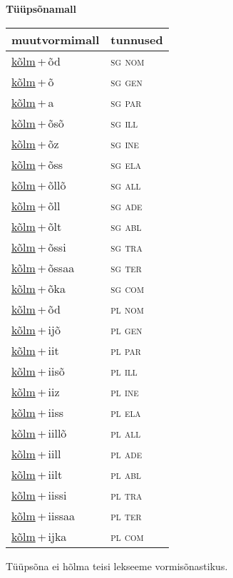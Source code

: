 
\vspace{1.8em}
\begin{minipage}{\textwidth}
\textbf{Tüüpsõnamall \,}\\

\begin{sideways}
\begin{tabular}{l l}
muutvormimall & tunnused \\
\hline
\underline{kõlm}\,+\,õd & \textsc{ sg nom } \\
\underline{kõlm}\,+\,õ & \textsc{ sg gen } \\
\underline{kõlm}\,+\,a & \textsc{ sg par } \\
\underline{kõlm}\,+\,õsõ & \textsc{ sg ill } \\
\underline{kõlm}\,+\,õz & \textsc{ sg ine } \\
\underline{kõlm}\,+\,õss & \textsc{ sg ela } \\
\underline{kõlm}\,+\,õllõ & \textsc{ sg all } \\
\underline{kõlm}\,+\,õll & \textsc{ sg ade } \\
\underline{kõlm}\,+\,õlt & \textsc{ sg abl } \\
\underline{kõlm}\,+\,õssi & \textsc{ sg tra } \\
\underline{kõlm}\,+\,õssaa & \textsc{ sg ter } \\
\underline{kõlm}\,+\,õka & \textsc{ sg com } \\
\underline{kõlm}\,+\,õd & \textsc{ pl nom } \\
\underline{kõlm}\,+\,ijõ & \textsc{ pl gen } \\
\underline{kõlm}\,+\,iit & \textsc{ pl par } \\
\underline{kõlm}\,+\,iisõ & \textsc{ pl ill } \\
\underline{kõlm}\,+\,iiz & \textsc{ pl ine } \\
\underline{kõlm}\,+\,iiss & \textsc{ pl ela } \\
\underline{kõlm}\,+\,iillõ & \textsc{ pl all } \\
\underline{kõlm}\,+\,iill & \textsc{ pl ade } \\
\underline{kõlm}\,+\,iilt & \textsc{ pl abl } \\
\underline{kõlm}\,+\,iissi & \textsc{ pl tra } \\
\underline{kõlm}\,+\,iissaa & \textsc{ pl ter } \\
\underline{kõlm}\,+\,ijka & \textsc{ pl com } \\
\end{tabular}
\end{sideways}
\label{tab:tüüpsõnamall-kõlmõd}

\end{minipage}

 
\vspace{1em}
\noindent Tüüpsõna ei hõlma teisi lekseeme vormi\-sõnastikus.
